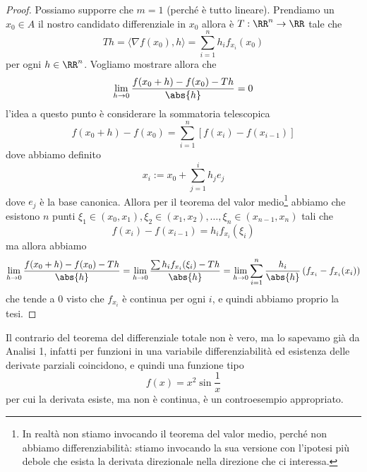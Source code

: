 \documentclass[11pt]{scrartcl}
\begin{document}
	\begin{proof}
		Possiamo supporre che $m=1$ (perché è tutto lineare). Prendiamo un $x_0\in A$ il nostro candidato differenziale in $x_0$ allora è $T:\RR^n\to\RR$ tale che
		$$Th=\langle \nabla f(x_0),h\rangle=\sum_{i=1}^n h_if_{x_i}(x_0)$$
		per ogni $h\in \RR^n$. Vogliamo mostrare allora che
		$$\lim_{h\to 0}\frac{f(x_0+h)-f(x_0)-Th}{\abs{h}}=0$$
		l'idea a questo punto è considerare la sommatoria telescopica
		$$f(x_0+h)-f(x_0)=\sum_{i=1}^n\left[f(x_i)-f(x_{i-1})\right]$$
		dove abbiamo definito 
		$$x_i:=x_0+\sum_{j=1}^i h_je_j$$
		dove $e_j$ è la base canonica. Allora per il teorema del valor medio\footnote{In realtà non stiamo invocando il teorema del valor medio, perché non abbiamo differenziabilità: stiamo invocando la sua versione con l'ipotesi più debole che esista la derivata direzionale nella direzione che ci interessa.} abbiamo che esistono $n$ punti $\xi_1\in (x_0,x_1),\xi_2\in (x_1,x_2),\dots,\xi_n\in (x_{n-1},x_n)$ tali che
		$$f(x_i)-f(x_{i-1})=h_if_{x_i}(\xi_i)$$
		ma allora abbiamo
		$$\lim_{h\to 0}\frac{f(x_0+h)-f(x_0)-Th}{\abs{h}}=\lim_{h\to 0}\frac{\sum h_if_{x_i}(\xi_i) -Th}{\abs{h}}=\lim_{h\to 0}\sum_{i=1}^n \frac{h_i}{\abs{h}}\left(f_{x_i}-f_{x_i}(x_i)\right)$$
		che tende a $0$ visto che $f_{x_i}$ è continua per ogni $i$, e quindi abbiamo proprio la tesi.
	\end{proof}
	Il contrario del teorema del differenziale totale non è vero, ma lo sapevamo già da Analisi 1, infatti per funzioni in una variabile differenziabilità ed esistenza delle derivate parziali coincidono, e quindi una funzione tipo 
	$$f(x)=x^2\sin\frac{1}{x}$$
	per cui la derivata esiste, ma non è continua, è un controesempio appropriato.
	
\end{document}
